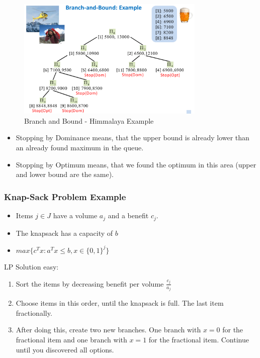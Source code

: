 \begin{figure}[H]
\centering
\includegraphics[width=0.8\textwidth]{figures/himmalayaExample.png}
\caption{Branch and Bound - Himmalaya Example}
\end{figure}

\begin{itemize}
    \item Stopping by Dominance means, that the upper bound is already lower than an already found maximum in the queue.
    \item Stopping by Optimum means, that we found the optimum in this area (upper and lower bound are the same).
\end{itemize}

\clearpage
\subsubsection{Knap-Sack Problem Example}

\begin{itemize}
    \item Items $j \in J$ have a volume $a_j$ and a benefit $c_j$.
    \item The knapsack has a capacity of $b$
    \item $max\{c^Tx:a^Tx\leq b, x \in \{0,1\}^j\}$
\end{itemize}
LP Solution easy:
\begin{enumerate}
    \item Sort the items by decreasing benefit per volume $\frac{c_j}{a_j}$
    \item Choose items in this order, until the knapsack is full. The last item fractionally. 
    \item After doing this, create two new branches. One branch with $x = 0$ for the fractional item and one branch with $x = 1$ for the fractional item. Continue until you discovered all options. 
\end{enumerate}

